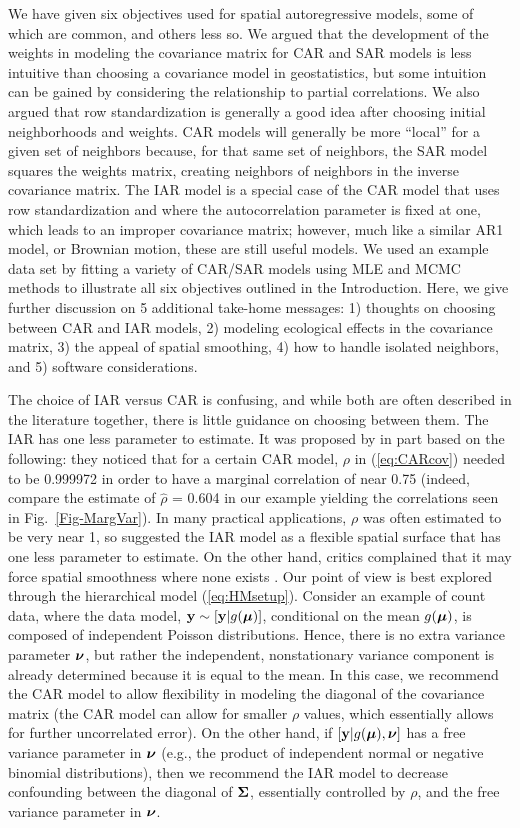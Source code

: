 \documentclass[11pt, titlepage]{article}\usepackage[]{graphicx}\usepackage[]{color}
\begin{document}
We have given six objectives used for spatial autoregressive models, some of which are common, and others less so.  We argued that the development of the weights in modeling the covariance matrix for CAR and SAR models is less intuitive than choosing a covariance model in geostatistics, but some intuition can be gained by considering the relationship to partial correlations.  We also argued that row standardization is generally a good idea after choosing initial neighborhoods and weights.  CAR models will generally be more ``local'' for a given set of neighbors because, for that same set of neighbors, the SAR model squares the weights matrix, creating neighbors of neighbors in the inverse covariance matrix. The IAR model is a special case of the CAR model that uses row standardization and where the autocorrelation parameter is fixed at one, which leads to an improper covariance matrix; however, much like a similar AR1 model, or Brownian motion, these are still useful models. We used an example data set by fitting a variety of CAR/SAR models using MLE and MCMC methods to illustrate all six objectives outlined in the Introduction.  Here, we give further discussion on 5 additional take-home messages: 1) thoughts on choosing between CAR and IAR models, 2) modeling ecological effects in the covariance matrix, 3) the appeal of spatial smoothing, 4) how to handle isolated neighbors, and 5) software considerations.

The choice of IAR versus CAR is confusing, and while both are often described in the literature together, there is little guidance on choosing between them.  The IAR has one less parameter to estimate.  It was proposed by \citet{Besa:Koop:cond:1995} in part based on the following: they noticed that for a certain CAR model, $\rho$ in (\ref{eq:CARcov}) needed to be 0.999972 in order to have a marginal correlation of near 0.75 (indeed, compare the estimate of $\hat{\rho}$ = 0.604 in our example yielding the correlations seen in Fig.~\ref{Fig-MargVar}). In many practical applications, $\rho$ was often estimated to be very near 1, so \citet{Besa:Koop:cond:1995} suggested the IAR model as a flexible spatial surface that has one less parameter to estimate.  On the other hand, critics complained that it may force spatial smoothness where none exists \citep[e.g.,][]{Lero:Lei:Bres:esti:2000}. Our point of view is best explored through the hierarchical model (\ref{eq:HMsetup}).  Consider an example of count data, where the data model, $\mathbf{y} \sim [\mathbf{y}|g(\mbox{\boldmath $\mu$})]$, conditional on the mean $g(\mbox{\boldmath $\mu$})$, is composed of independent Poisson distributions. Hence, there is no extra variance parameter $\mbox{\boldmath $\nu$}$, but rather the independent, nonstationary variance component is already determined because it is equal to the mean. In this case, we recommend the CAR model to allow flexibility in modeling the diagonal of the covariance matrix (the CAR model can allow for smaller $\rho$ values, which essentially allows for further uncorrelated error).  On the other hand, if $[\mathbf{y}|g(\mbox{\boldmath $\mu$}),\mbox{\boldmath $\nu$}]$ has a free variance parameter in $\mbox{\boldmath $\nu$}$ (e.g., the product of independent normal or negative binomial distributions), then we recommend the IAR model to decrease confounding between the diagonal of $\mbox{\boldmath $\Sigma$}$, essentially controlled by $\rho$, and the free variance parameter in $\mbox{\boldmath $\nu$}$.
\end{document}
